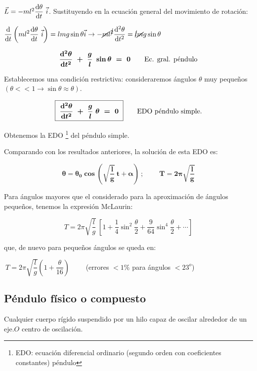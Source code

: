 {$\vec L=-ml^2 \displaystyle \dv{\theta}{t} \ \vec i$. Sustituyendo en la ecuación general del movimiento de rotación:

$\displaystyle \dv{t} \left( ml^2 \dv{\theta}{t} \ \vec i \right)=lmg\sin \theta \vec i \to -\cancel{m} l^{\cancel{2}}\dv[2]{\theta}{t}=\cancel{l}\cancel{m}g\sin \theta$

\begin{equation}
\displaystyle \boldsymbol{\dv[2]{\theta}{t} \ + \ \dfrac g l \ \sin \theta \ = \ 0} \qquad \text{Ec. gral. péndulo}
\end{equation}
 
Establecemos una condición restrictiva: consideraremos ángulos $\theta$ muy pequeños \textcolor{gris}{$(\theta<<1 \to \sin \theta \approx \theta)$}.

\begin{equation}
\displaystyle \boxed{\ \boldsymbol{\dv[2]{\theta}{t} \ + \ \dfrac g l \  \theta \ = \ 0}\ } \qquad \text{EDO péndulo simple.}
\end{equation}

Obtenemos la EDO \footnote{EDO: ecuación diferencial ordinario (segundo orden con coeficientes constantes) péndulo} del péndulo simple.

Comparando con los resultados anteriores, la solución de esta EDO es:

\begin{equation}
\boldsymbol{
\theta=\theta_0 \cos \left( \sqrt{\dfrac l g} \ t + \alpha \right)\ ; \qquad  \ T=2\pi \sqrt{\dfrac l g}
}	
\end{equation}

Para ángulos mayores que el considerado para la aproximación de ángulos pequeños, tenemos la expresión \textcolor{gris}{McLaurin}:

$$T=2\pi \sqrt{\dfrac l g} \ \left[ 1 + \dfrac 1 4 \sin^2 \dfrac {\theta}{2} + \dfrac 9{64} \sin^4 \dfrac{\theta}{2} + \cdots \right]$$

que, de nuevo para pequeños ángulos se queda en: 

$\ T=2\pi \sqrt{\dfrac l g} \left( 1+\dfrac{\theta}{16} \right) \qquad$
\textcolor{gris}{(errores $<1 \%$ para ángulos $<23^o$)}

\subsection{Péndulo físico o compuesto}
\begin{multicols}{2}
Cualquier cuerpo rígido suspendido por un hilo capaz de oscilar alrededor de un eje.$O$ centro de oscilación.


\end{multicols}}
